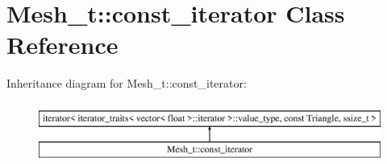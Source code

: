 \hypertarget{classMesh__t_1_1const__iterator}{\section{Mesh\+\_\+t\+:\+:const\+\_\+iterator Class Reference}
\label{classMesh__t_1_1const__iterator}
}
Inheritance diagram for Mesh\+\_\+t\+:\+:const\+\_\+iterator\+:\begin{figure}[H]
\begin{center}
\leavevmode
\includegraphics[height=2.000000cm]{classMesh__t_1_1const__iterator}
\end{center}
\end{figure}
